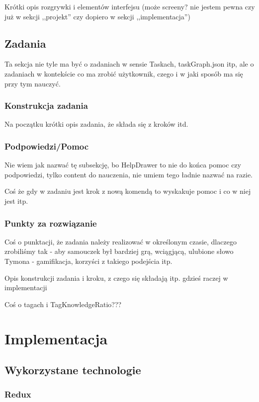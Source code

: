 \documentclass[11pt,a4paper,polish,thesis]{dcsbook}
\begin{document}
	Krótki opis rozgrywki i elementów interfejsu (może screeny? nie jestem pewna czy już w sekcji ,,projekt'' czy dopiero w sekcji ,,implementacja'')
	
	\section{Zadania}
	
	Ta sekcja nie tyle ma być o zadaniach w sensie Taskach, taskGraph.json itp, ale o zadaniach w kontekście co ma zrobić użytkownik, czego i w jaki sposób ma się przy tym nauczyć.
	
	\subsection{Konstrukcja zadania}
	Na początku krótki opis zadania, że składa się z kroków itd.
	
	\subsection{Podpowiedzi/Pomoc}
	Nie wiem jak nazwać tę subsekcję, bo HelpDrawer to nie do końca pomoc czy podpowiedzi, tylko content do nauczenia, nie umiem tego ładnie nazwać na razie.
	
	Coś że gdy w zadaniu jest krok z nową komendą to wyskakuje pomoc i co w niej jest itp.
	
	\subsection{Punkty za rozwiązanie}
	Coś o punktacji, że zadania należy realizować w określonym czasie, dlaczego zrobiliśmy tak - aby samouczek był bardziej grą, wciągjącą, ulubione słowo Tymona - gamifikacja, korzyści z takiego podejścia itp.

	Opis konstrukcji zadania i kroku, z czego się składają itp. gdzieś raczej w implementacji
	
	Coś o tagach i TagKnowledgeRatio???
	
	\chapter{Implementacja}
	
	\section{Wykorzystane technologie}
	
	\subsection{Redux}
	
\end{document}
